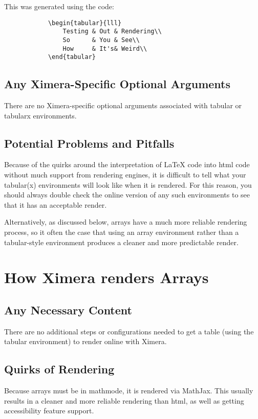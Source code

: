 \documentclass{ximera}
\begin{document}
        This was generated using the code:
        \begin{verbatim}
            \begin{tabular}{lll}
                Testing & Out & Rendering\\
                So      & You & See\\
                How     & It's& Weird\\
            \end{tabular}
        \end{verbatim}
        
    \subsection*{Any Ximera-Specific Optional Arguments}
        There are no Ximera-specific optional arguments associated with tabular or tabularx environments.
        
        
    \subsection*{Potential Problems and Pitfalls}
        Because of the quirks around the interpretation of LaTeX code into html code without much support from rendering engines, it is difficult to tell what your tabular(x) environments will look like when it is rendered. For this reason, you should always double check the online version of any such environments to see that it has an acceptable render. 
        
        Alternatively, as discussed below, arrays have a much more reliable rendering process, so it often the case that using an array environment rather than a tabular-style environment produces a cleaner and more predictable render.
        
        
\section*{How Ximera renders Arrays}
    \subsection*{Any Necessary Content}
        There are no additional steps or configurations needed to get a table (using the tabular environment) to render online with Ximera.
        
        
    \subsection*{Quirks of Rendering}
        Because arrays must be in mathmode, it is rendered via MathJax. This usually results in a cleaner and more reliable rendering than html, as well as getting accessibility feature support.
        
\end{document}
